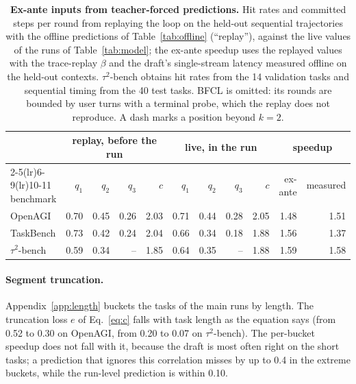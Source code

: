 \begin{table}[t]
\centering
\caption{\textbf{Ex-ante inputs from teacher-forced predictions.} Hit rates and committed steps per
round from replaying the loop on the held-out sequential trajectories with the offline predictions of
Table~\ref{tab:offline} (``replay''), against the live values of the runs of Table~\ref{tab:model}; the
ex-ante speedup uses the replayed values with the trace-replay $\beta$ and the draft's single-stream
latency measured offline on the held-out contexts. $\tau^2$-bench obtains hit rates from the 14 validation tasks and sequential timing from the 40 test tasks. BFCL is omitted: its
rounds are bounded by user turns with a terminal probe, which the replay does not reproduce. A dash marks
a position beyond $k{=}2$.}
\label{tab:exante}
\small
\begin{tabular}{lrrrrrrrrrr}
\toprule
 & \multicolumn{4}{c}{replay, before the run} & \multicolumn{4}{c}{live, in the run} & \multicolumn{2}{c}{speedup} \\
\cmidrule(lr){2-5}\cmidrule(lr){6-9}\cmidrule(lr){10-11}
benchmark & $q_1$ & $q_2$ & $q_3$ & $c$ & $q_1$ & $q_2$ & $q_3$ & $c$ & ex-ante & measured \\
\midrule
OpenAGI        & 0.70 & 0.45 & 0.26 & 2.03 & 0.71 & 0.44 & 0.28 & 2.05 & 1.48\xx{} & 1.51\xx{} \\
TaskBench      & 0.73 & 0.42 & 0.24 & 2.04 & 0.66 & 0.34 & 0.18 & 1.88 & 1.56\xx{} & 1.37\xx{} \\
$\tau^2$-bench & 0.59 & 0.34 & --   & 1.85 & 0.64 & 0.35 & --   & 1.88 & 1.59\xx{} & 1.58\xx{} \\
\bottomrule
\end{tabular}
\end{table}

\paragraph{Segment truncation.}
Appendix~\ref{app:length} buckets the tasks of the main runs by length. The truncation loss $e$ of
Eq.~\ref{eq:c} falls with task length as the equation says (from 0.52 to 0.30 on OpenAGI, from 0.20 to 0.07
on $\tau^2$-bench). The per-bucket speedup does not fall with it, because the draft is most often right on the
short tasks; a prediction that ignores this correlation misses by up to 0.4 in the extreme buckets, while
the run-level prediction is within 0.10.

